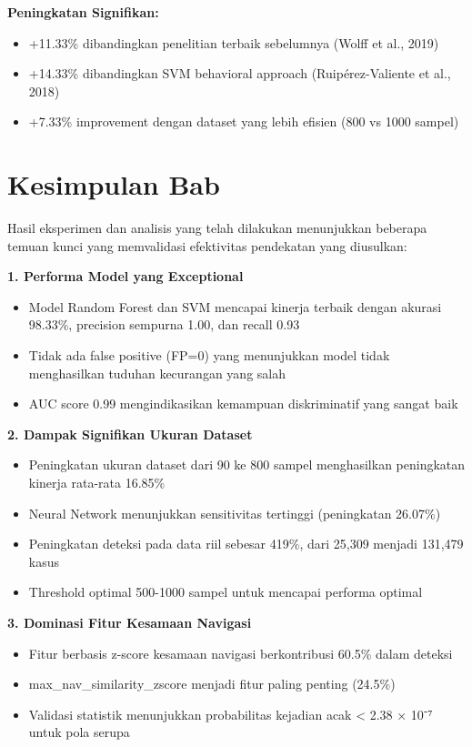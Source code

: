 \textbf{Peningkatan Signifikan:}
\begin{itemize}
    \item +11.33\% dibandingkan penelitian terbaik sebelumnya (Wolff et al., 2019)
    \item +14.33\% dibandingkan SVM behavioral approach (Ruipérez-Valiente et al., 2018)
    \item +7.33\% improvement dengan dataset yang lebih efisien (800 vs 1000 sampel)
\end{itemize}

\section{Kesimpulan Bab}
\label{sec:kesimpulanBab4}

Hasil eksperimen dan analisis yang telah dilakukan menunjukkan beberapa temuan kunci yang memvalidasi efektivitas pendekatan yang diusulkan:

\textbf{1. Performa Model yang Exceptional}
\begin{itemize}
    \item Model Random Forest dan SVM mencapai kinerja terbaik dengan akurasi 98.33\%, precision sempurna 1.00, dan recall 0.93
    \item Tidak ada false positive (FP=0) yang menunjukkan model tidak menghasilkan tuduhan kecurangan yang salah
    \item AUC score 0.99 mengindikasikan kemampuan diskriminatif yang sangat baik
\end{itemize}

\textbf{2. Dampak Signifikan Ukuran Dataset}
\begin{itemize}
    \item Peningkatan ukuran dataset dari 90 ke 800 sampel menghasilkan peningkatan kinerja rata-rata 16.85\%
    \item Neural Network menunjukkan sensitivitas tertinggi (peningkatan 26.07\%)
    \item Peningkatan deteksi pada data riil sebesar 419\%, dari 25,309 menjadi 131,479 kasus
    \item Threshold optimal 500-1000 sampel untuk mencapai performa optimal
\end{itemize}

\textbf{3. Dominasi Fitur Kesamaan Navigasi}
\begin{itemize}
    \item Fitur berbasis z-score kesamaan navigasi berkontribusi 60.5\% dalam deteksi
    \item max\_nav\_similarity\_zscore menjadi fitur paling penting (24.5\%)
    \item Validasi statistik menunjukkan probabilitas kejadian acak < 2.38 × 10⁻⁷ untuk pola serupa
\end{itemize}

